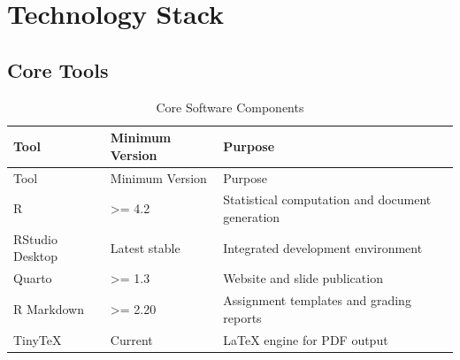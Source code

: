 \documentclass[
]{article}
\begin{document}
\newpage

\section{Technology Stack}\label{technology-stack}

\subsection{Core Tools}\label{core-tools}

\begin{longtable}[]{@{}
  >{\raggedright\arraybackslash}p{}
  >{\raggedright\arraybackslash}p{}
  >{\raggedright\arraybackslash}p{}@{}}
\caption{Core Software Components}\tabularnewline
\toprule\noalign{}
\begin{minipage}[b]{\linewidth}\raggedright
Tool
\end{minipage} & \begin{minipage}[b]{\linewidth}\raggedright
Minimum Version
\end{minipage} & \begin{minipage}[b]{\linewidth}\raggedright
Purpose
\end{minipage} \\
\midrule\noalign{}
\endfirsthead
\toprule\noalign{}
\begin{minipage}[b]{\linewidth}\raggedright
Tool
\end{minipage} & \begin{minipage}[b]{\linewidth}\raggedright
Minimum Version
\end{minipage} & \begin{minipage}[b]{\linewidth}\raggedright
Purpose
\end{minipage} \\
\midrule\noalign{}
\endhead
\bottomrule\noalign{}
\endlastfoot
R & \textgreater= 4.2 & Statistical computation and document
generation \\
RStudio Desktop & Latest stable & Integrated development environment \\
Quarto & \textgreater= 1.3 & Website and slide publication \\
R Markdown & \textgreater= 2.20 & Assignment templates and grading
reports \\
TinyTeX & Current & LaTeX engine for PDF output \\
\end{longtable}
\end{document}
